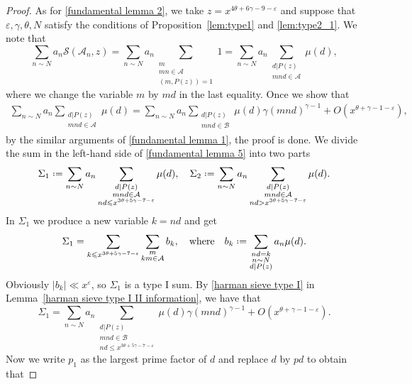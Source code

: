 \documentclass[10pt,a4paper]{amsart}
\newcommand{\cA}{\ensuremath{\mathcal{A}}}
\newcommand{\cB}{\ensuremath{\mathcal{B}}}
\newcommand{\cS}{\ensuremath{\mathcal{S}}}
\newcommand*{\defeq}{\mathrel{\vcenter{\baselineskip0.5ex \lineskiplimit0pt
			\hbox{\scriptsize.}\hbox{\scriptsize.}}}%
	=}
\begin{document}
\begin{proof}
As for \eqref{fundamental lemma 2}, we take $z = x^{4\theta + 6\gamma - 9 - \varepsilon}$ and suppose that $\varepsilon, \gamma, \theta, N$ satisfy the conditions of Proposition~\ref{lem:type1} and \ref{lem:type2_1}. We note that
$$
\sum_{n \sim N} a_n \cS(\cA_n, z) = \sum_{n \sim N} a_n \sum_{\substack{ m \\ mn\in \cA \\ (m,P(z))=1}}1 =\sum_{n \sim N} a_n \sum_{\substack{ d|P(z) \\ mnd \in \cA}} \mu(d),
$$
where we change the variable $m$ by $md$ in the last equality. Once we show that
\begin{align}\label{fundamental lemma 5}
\sum_{n \sim N} a_n \sum_{\substack{ d|P(z) \\ mnd \in \cA}} \mu(d) = \sum_{n \sim N} a_n \sum_{\substack{ d|P(z) \\ mnd \in \cB}} \mu(d) \gamma (mnd)^{\gamma-1} + O(x^{\theta + \gamma - 1 - \varepsilon}),
\end{align}
by the similar arguments of \eqref{fundamental lemma 1}, the proof is done. We divide the sum in the left-hand side of \eqref{fundamental lemma 5} into two parts
\begin{align*}
\Sigma_1 \defeq \sum_{n \sim N} a_n \sum_{\substack{ d|P(z) \\ mnd \in \cA \\ nd \leqslant x^{3\theta+5\gamma-7-\varepsilon}}} \mu(d), \quad
\Sigma_2 \defeq \sum_{n \sim N} a_n \sum_{\substack{ d|P(z) \\ mnd \in \cA \\ nd > x^{3\theta+5\gamma-7-\varepsilon}}} \mu(d).
\end{align*}
In $\Sigma_1$ we produce a new variable $k = nd$ and get
$$
\Sigma_1 = \sum_{k \leqslant x^{3\theta+5\gamma-7-\varepsilon}} \sum_{\substack{m \\ km \in \cA }} b_k, \quad \text{where} \quad b_k \defeq \sum_{\substack{nd=k \\ n \sim N \\ d|P(z)}}a_n \mu(d).
$$
Obviously $|b_k| \ll x^{\varepsilon}$, so $\Sigma_1$ is a type I sum. By \eqref{harman sieve type I} in Lemma~\ref{harman sieve type I II information}, we have that
$$
\Sigma_1 = \sum_{n \sim N} a_n \sum_{\substack{ d|P(z) \\ mnd \in \cB \\ nd \leqslant x^{3\theta+5\gamma-7-\varepsilon}}} \mu(d) \gamma (mnd)^{\gamma-1} + O(x^{\theta + \gamma - 1 - \varepsilon}).
$$
Now we write $p_1$ as the largest prime factor of $d$ and replace $d$ by $pd$ to obtain that

\end{proof}
\end{document}

